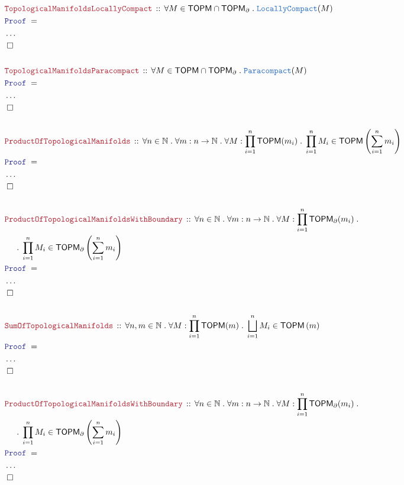 \documentclass[12pt]{scrartcl}
\newcommand{\TYPE}[1]{\textcolor{NavyBlue}{\mathtt{#1}}}
\newcommand{\LOGIC}[1]{\textcolor{Blue}{\mathtt{#1}}}
\newcommand{\THM}[1]{\textcolor{Maroon}{\mathtt{#1}}}
\renewcommand{\.}{\; . \;}
\newcommand{\Theorem}[2]{& \THM{#1} \, :: \, #2 \\ & \Proof = \\ }
\newcommand{\NewLine}{\\ & \kern 1pc}
\newcommand{\Page}[1]{ \begin{align*} #1 \end{align*}   }
\newcommand{\NoProof}{ & \ldots \\ \EndProof}
\newcommand{\Nat}{\mathbb{N} }
\newcommand{\QED}{\; \square}
\newcommand{\EndProof}{& \QED \\}
\newcommand{\Proof}{\LOGIC{Proof} \; }
\newcommand{\TOPM}{\mathsf{TOPM}}
\begin{document}
\Page{
	\Theorem{TopologicalManifoldsLocallyCompact}
	{
		\forall M \in \TOPM \cap \TOPM_\partial \.
		\TYPE{LocallyCompact}(M)
	}
	\NoProof
	\\
	\Theorem{TopologicalManifoldsParacompact}
	{
		\forall M \in \TOPM \cap \TOPM_\partial \.
		\TYPE{Paracompact}(M)
	}
	\NoProof
	\\
	\Theorem{ProductOfTopologicalManifolds}
	{
		\forall n \in \Nat \.
		\forall m : n \to \Nat \.
		\forall M : \prod^n_{i=1} \TOPM(m_i) \.
		\prod^n_{i=1} M_i \in \TOPM\left( \sum^n_{i=1} m_i \right)
	}
	\NoProof
	\\
	\Theorem{ProductOfTopologicalManifoldsWithBoundary}
	{
		\forall n \in \Nat \.
		\forall m : n \to \Nat \.
		\forall M : \prod^n_{i=1} \TOPM_\partial(m_i) \. \NewLine \. 
		\prod^n_{i=1} M_i \in \TOPM_\partial\left( \sum^n_{i=1} m_i \right)
	}
	\NoProof
	\\
	\Theorem{SumOfTopologicalManifolds}
	{
		\forall n,m \in \Nat \.
		\forall M : \prod^n_{i=1} \TOPM(m) \.
		\bigsqcup^n_{i=1} M_i \in \TOPM\left( m \right)
	}
	\NoProof
	\\
	\Theorem{ProductOfTopologicalManifoldsWithBoundary}
	{
		\forall n \in \Nat \.
		\forall m : n \to \Nat \.
		\forall M : \prod^n_{i=1} \TOPM_\partial(m_i) \.
		\NewLine \. 
		\prod^n_{i=1} M_i \in \TOPM_\partial\left( \sum^n_{i=1} m_i \right)
	}
	\NoProof
}
\end{document}
